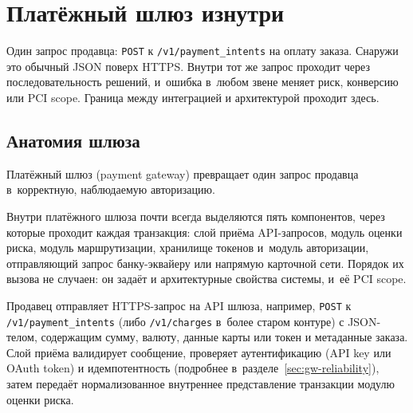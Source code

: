 
\chapter{Платёжный шлюз изнутри}\label{ch:gateway}

Один запрос продавца: \texttt{POST} к \texttt{/v1/payment\_intents}
на оплату заказа. Снаружи это обычный JSON поверх HTTPS. Внутри
тот же запрос проходит через последовательность решений,
и~ошибка в~любом звене меняет риск, конверсию или
PCI scope. Граница между интеграцией и архитектурой проходит здесь.

\section{Анатомия шлюза}\label{sec:gw-anatomy}

Платёжный шлюз (payment gateway) превращает один запрос продавца
в~корректную, наблюдаемую авторизацию.


Внутри платёжного шлюза почти всегда выделяются пять компонентов,
через которые проходит каждая транзакция: слой приёма API-запросов,
модуль оценки риска, модуль маршрутизации, хранилище токенов
и~модуль авторизации, отправляющий запрос банку-эквайеру
или напрямую карточной сети. Порядок их вызова не случаен:
он задаёт и архитектурные свойства системы, и~её PCI scope.

Продавец отправляет HTTPS-запрос на API шлюза, например,
\texttt{POST} к \texttt{/v1/payment\_intents} (либо
\texttt{/v1/charges} в~более старом контуре) с JSON-телом,
содержащим сумму, валюту, данные карты или токен и метаданные
заказа. Слой приёма валидирует сообщение, проверяет
аутентификацию (API key или OAuth token) и идемпотентность
(подробнее в~разделе~\ref{sec:gw-reliability}), затем передаёт
нормализованное внутреннее представление транзакции модулю оценки риска.

